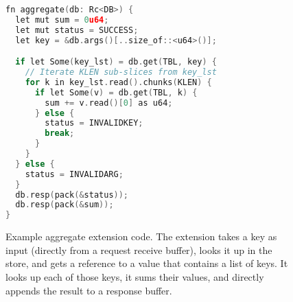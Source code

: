 \begin{figure}[t]
\centering
\begin{lstlisting}[language=C++]
fn aggregate(db: Rc<DB>) {
  let mut sum = 0u64;
  let mut status = SUCCESS;
  let key = &db.args()[..size_of::<u64>()];

  if let Some(key_lst) = db.get(TBL, key) {
    // Iterate KLEN sub-slices from key_lst
    for k in key_lst.read().chunks(KLEN) {
      if let Some(v) = db.get(TBL, k) {
        sum += v.read()[0] as u64;
      } else {
        status = INVALIDKEY;
        break;
      }
    }
  } else {
    status = INVALIDARG;
  }
  db.resp(pack(&status));
  db.resp(pack(&sum));
}
\end{lstlisting}
\caption{Example aggregate extension code. The extension takes a key as
input (directly from a request receive buffer), looks it up in the
store, and gets a reference to a value that contains a list of keys. It
looks up each of those keys, it sums their values, and directly appends
the result to a response buffer.}
\label{lst:aggregate}
\end{figure}
